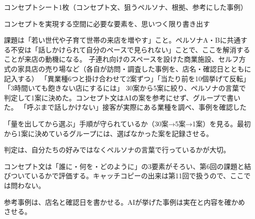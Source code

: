 \begin{nexttime}
  \item コンセプトシート1枚（コンセプト文、狙うペルソナ、根拠、参考にした事例）
  \item コンセプトを実現する空間に必要な要素を、思いつく限り書き出す
\end{nexttime}
{課題は「若い世代や子育て世帯の来店を増やす」こと。ペルソナA・Bに共通する不安は「話しかけられて自分のペースで見られない」ことで、ここを解消することが来店の動機になる。}
{子連れ向けのスペースを設けた商業施設、セルフ方式の家具店の売り場など（各自が訪問・調査した事例を、店名・確認日とともに記入する）}
{「異業種6つと掛け合わせて2案ずつ」「当たり前を10個挙げて反転」「3時間いても飽きない店にするには」}
{30案から5案に絞り、ペルソナの言葉で判定して1案に決めた。コンセプト文はAIの案を参考にせず、グループで書いた。}
{「呼ぶまで話しかけない」接客が実際にある業種を調べ、事例を確認した}

\begin{point}
  \item 「量を出してから選ぶ」手順が守られているか（30案→5案→1案）を見る。最初から1案に決めているグループには、選ばなかった案を記録させる。
  \item 判定は、自分たちの好みではなくペルソナの言葉で行っているかが大切。
  \item コンセプト文は「誰に・何を・どのように」の3要素がそろい、第6回の課題と結びついているかで評価する。キャッチコピーの出来は第11回で扱うので、ここでは問わない。
  \item 参考事例は、店名と確認日を書かせる。AIが挙げた事例は実在と内容を確かめさせる。
\end{point}
